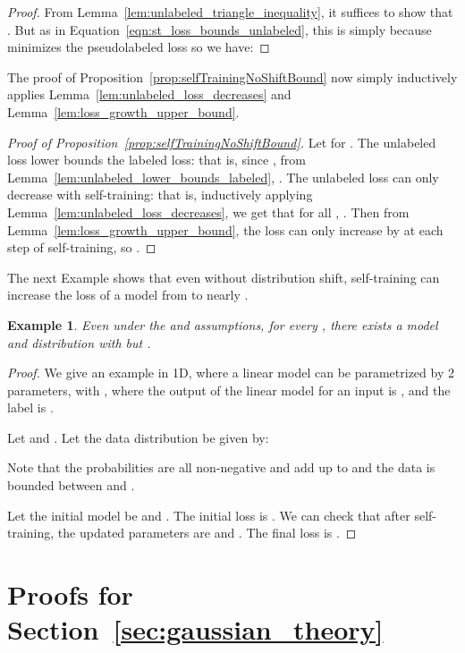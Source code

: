 \documentclass[11pt]{article}
\newtheorem{example}[theorem]{Example}
\begin{document}
\begin{proof}
From Lemma~\ref{lem:unlabeled_triangle_inequality}, it suffices to show that . But as in Equation~\eqref{eqn:st_loss_bounds_unlabeled}, this is simply because  minimizes the pseudolabeled loss so we have:

\end{proof}

The proof of Proposition~\ref{prop:selfTrainingNoShiftBound} now simply inductively applies Lemma~\ref{lem:unlabeled_loss_decreases} and Lemma~\ref{lem:loss_growth_upper_bound}.

\begin{proof}[Proof of Proposition~\ref{prop:selfTrainingNoShiftBound}]
Let  for .
The unlabeled loss lower bounds the labeled loss: that is, since , from Lemma~\ref{lem:unlabeled_lower_bounds_labeled}, .
The unlabeled loss can only decrease with self-training: that is, inductively applying Lemma~\ref{lem:unlabeled_loss_decreases}, we get that for all , .
Then from Lemma~\ref{lem:loss_growth_upper_bound}, the loss can only increase by  at each step of self-training, so .
\end{proof}

The next Example shows that even without distribution shift, self-training can increase the loss of a model from  to nearly .

\begin{example}
Even under the \sepAssump{} and \boundedAssump{} assumptions, for every , there exists a model  and distribution  with  but . 
\end{example}

\begin{proof}
We give an example in 1D, where a linear model can be parametrized by 2 parameters,  with , where the output of the linear model for an input  is , and the label is .

Let  and .
Let the data distribution  be given by:




Note that the probabilities are all non-negative and add up to  and the data is bounded between  and .

Let the initial model be  and .
The initial loss is .
We can check that after self-training, the updated parameters are  and .
The final loss is .

\end{proof}
 
\newpage

\section{Proofs for Section~\ref{sec:gaussian_theory}}
\label{sec:appendix_gaussian_theory}
\end{document}
